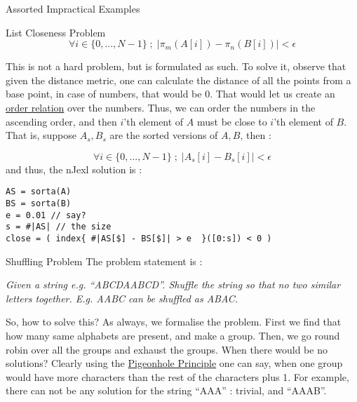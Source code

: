 \begin{section}{Assorted Impractical Examples}
\begin{subsection}{List Closeness Problem}
$$
\forall i \in \{ 0 , ... , N - 1 \} \; ; \;  |\pi_m(A[i]) - \pi_n(B[i]) | < \epsilon  
$$   

This is not a hard problem, but is formulated as such. To solve it, observe that given the distance metric, 
one can calculate the distance of all the points from a base point, in case of numbers, that would be 0. 
That would let us create an \href{https://en.wikipedia.org/wiki/Total\_order}{order relation} over the numbers.
Thus, we can order the numbers in the ascending order, and then $i$'th element of $A$ must be close to $i$'th element of $B$.
That is, suppose $A_s,B_s$ are the sorted versions of $A,B$, then :

$$
\forall i \in \{ 0 , ... , N - 1 \} \; ; \;  | A_s[i] - B_s[i] | < \epsilon  
$$   
and thus, the nJexl solution is :
 
\begin{center}\begin{minipage}{\linewidth}
\begin{lstlisting}[style=JexlStyle]
AS = sorta(A)
BS = sorta(B)
e = 0.01 // say?
s = #|AS| // the size 
close = ( index{ #|AS[$] - BS[$]| > e  }([0:s]) < 0 )
\end{lstlisting}  
\end{minipage}\end{center}
\end{subsection}

\begin{subsection}{Shuffling Problem}
The problem statement is :

\emph{Given a string e.g. ``ABCDAABCD''. Shuffle the string so that no two similar letters together. 
E.g. AABC can be shuffled as ABAC.}

So, how to solve this? As always, we formalise the problem. 
First we find that how many same alphabets are present, and make a group.
Then, we go round robin over all the groups and exhaust the groups.
When there would be no solutions? Clearly using the \href{https://en.wikipedia.org/wiki/Pigeonhole\_principle}{Pigeonhole Principle} 
one can say, when one group would have more characters than the rest of the characters plus 1.
For example, there can not be any solution for the string ``AAA'' : trivial, and ``AAAB''.


\end{subsection}
\end{section}
